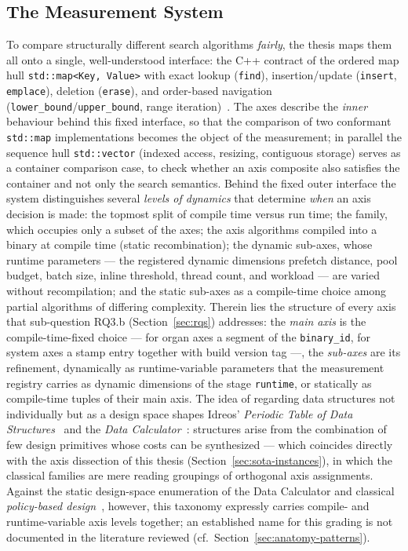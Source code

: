 \begin{nurlang}
\section{The Measurement System}\label{sec:measurement-system}
To compare structurally different search algorithms \emph{fairly}, the thesis maps them all
onto a single, well-understood interface: the C++ contract of the ordered map hull
\texttt{std::map<Key,\,Value>} with exact lookup (\texttt{find}), insertion/update (\texttt{insert},
\texttt{emplace}), deletion (\texttt{erase}), and order-based navigation
(\texttt{lower\_bound}/\texttt{upper\_bound}, range iteration)~\cite{iso_cpp}. The axes describe the
\emph{inner} behaviour behind this fixed interface, so that the comparison of two conformant
\texttt{std::map} implementations becomes the object of the measurement; in parallel the sequence hull
\texttt{std::vector} (indexed access, resizing, contiguous storage) serves as a
container comparison case, to check whether an axis composite also satisfies the container and not only the
search semantics. Behind the fixed outer interface the system distinguishes several \emph{levels
of dynamics} that determine \emph{when} an axis decision is made: the topmost split of
compile time versus run time; the family, which occupies only a subset of the axes; the axis algorithms
compiled into a binary at compile time (static recombination); the
dynamic sub-axes, whose runtime parameters --- the registered dynamic dimensions
prefetch distance, pool budget, batch size, inline threshold, thread count, and workload --- are varied without
recompilation; and the static sub-axes as a compile-time
choice among partial algorithms of differing complexity. Therein lies the structure of every axis
that sub-question RQ3.b (Section~\ref{sec:rqs}) addresses: the \emph{main axis} is the
compile-time-fixed choice --- for organ axes a segment of the \texttt{binary\_id}, for
system axes a stamp entry together with build version tag ---, the \emph{sub-axes} are its
refinement, dynamically as runtime-variable parameters that the measurement registry carries as dynamic
dimensions of the stage \texttt{runtime}, or statically as compile-time tuples of their
main axis. The idea of regarding
data structures not individually
but as a design space shapes Idreos' \emph{Periodic Table of Data
Structures}~\cite{idreos2018periodic} and the \emph{Data Calculator}~\cite{idreos2018datacalculator}:
structures arise from the combination of few design primitives whose costs can be synthesized
--- which coincides directly with the axis dissection of this thesis
(Section~\ref{sec:sota-instances}), in which the classical families are mere reading groupings of
orthogonal axis assignments. Against the static
design-space enumeration of the Data Calculator and classical
\emph{policy-based design}~\cite{alexandrescu2001modern}, however, this taxonomy expressly carries compile- and
runtime-variable axis levels together; an established name for this
grading is not documented in the literature reviewed (cf.\ Section~\ref{sec:anatomy-patterns}).
\end{nurlang}
